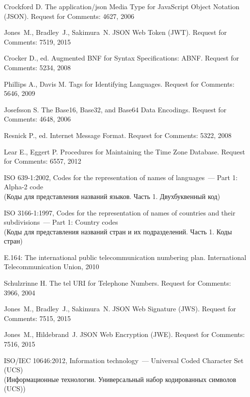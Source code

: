 \begin{thebibliography}{99}
Crockford D.
The application/json Media Type for JavaScript Object Notation (JSON).
Request for Comments: 4627, 2006

Jones~M., Bradley~J., Sakimura~N. 
JSON Web Token (JWT).
Request for Comments: 7519, 2015

Crocker D., ed.
Augmented BNF for Syntax Specifications: ABNF.
Request for Comments: 5234, 2008

Phillips A., Davis M. 
Tags for Identifying Languages.
Request for Comments: 5646, 2009

Josefsson S. 
The Base16, Base32, and Base64 Data Encodings.
Request for Comments: 4648, 2006

Resnick P., ed. 
Internet Message Format.
Request for Comments: 5322, 2008

Lear E., Eggert P.
Procedures for Maintaining the Time Zone Database.
Request for Comments: 6557, 2012

ISO 639-1:2002, Codes for the representation of names of languages~---
Part 1: Alpha-2 code\\
{\small (Коды для представления названий языков. Часть 1. Двухбуквенный код)}

ISO 3166-1:1997, Codes for the representation of names of
countries and their subdivisions~--- Part 1: Country codes\\
{\small (Коды для представления названий стран и их подразделений. Часть 1. 
Коды стран)}

E.164: The international public telecommunication numbering plan.
International Telecommunication Union, 2010

Schulzrinne H. 
The tel URI for Telephone Numbers.
Request for Comments: 3966, 2004

Jones~M., Bradley~J., Sakimura~N. 
JSON Web Signature (JWS).
Request for Comments: 7515, 2015

Jones~M., Hildebrand~J. 
JSON Web Encryption (JWE).
Request for Comments: 7516, 2015

ISO/IEC 10646:2012, Information technology~--- Universal Coded Character Set 
(UCS)\\
{\small (Информационные технологии. Универсальный набор кодированных 
символов (UCS))}


\end{thebibliography}

